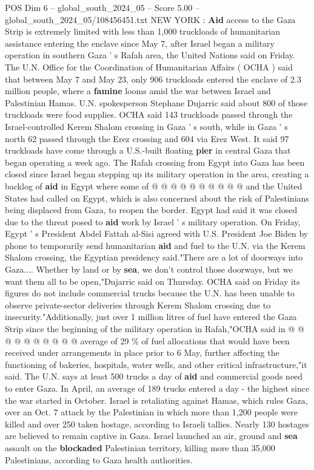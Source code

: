 \begin{textsample}{POS Dim 6 – global\_south\_2024\_05 – Score 5.00 – global\_south\_2024\_05/108456451.txt}  \label{ex:f6_pos_160}
NEW YORK : \textbf{Aid} access to the Gaza Strip is extremely limited with less than 1,000 truckloads of humanitarian assistance entering the enclave since May 7, after Israel began a military operation in southern Gaza ' s Rafah area, the United Nations said on Friday.
The U.N.
Office for the Coordination of Humanitarian Affairs ( OCHA ) said that between May 7 and May 23, only 906 truckloads entered the enclave of 2.3 million people, where a \textbf{famine} looms amid the war between Israel and Palestinian Hamas.
U.N. spokesperson Stephane Dujarric said about 800 of those truckloads were food supplies.
OCHA said 143 truckloads passed through the Israel-controlled Kerem Shalom crossing in Gaza ' s south, while in Gaza ' s north 62 passed through the Erez crossing and 604 via Erez West.
It said 97 truckloads have come through a U.S.-built floating \textbf{pier} in central Gaza that began operating a week ago.
The Rafah crossing from Egypt into Gaza has been closed since Israel began stepping up its military operation in the area, creating a backlog of \textbf{aid} in Egypt where some of @ @ @ @ @ @ @ @ @ @ and the United States had called on Egypt, which is also concerned about the risk of Palestinians being displaced from Gaza, to reopen the border.
Egypt had said it was closed due to the threat posed to \textbf{aid} work by Israel ' s military operation.
On Friday, Egypt ' s President Abdel Fattah al-Sisi agreed with U.S.
President Joe Biden by phone to temporarily send humanitarian \textbf{aid} and fuel to the U.N. via the Kerem Shalom crossing, the Egyptian presidency said."There are a lot of doorways into Gaza....
Whether by land or by \textbf{sea}, we don't control those doorways, but we want them all to be open,"Dujarric said on Thursday.
OCHA said on Friday its figures do not include commercial trucks because the U.N. has been unable to observe private-sector deliveries through Kerem Shalom crossing due to insecurity."Additionally, just over 1 million litres of fuel have entered the Gaza Strip since the beginning of the military operation in Rafah,"OCHA said in @ @ @ @ @ @ @ @ @ @ average of 29 \% of fuel allocations that would have been received under arrangements in place prior to 6 May, further affecting the functioning of bakeries, hospitals, water wells, and other critical infrastructure,"it said.
The U.N. says at least 500 trucks a day of \textbf{aid} and commercial goods need to enter Gaza.
In April, an average of 189 trucks entered a day - the highest since the war started in October.
Israel is retaliating against Hamas, which rules Gaza, over an Oct. 7 attack by the Palestinian in which more than 1,200 people were killed and over 250 taken hostage, according to Israeli tallies.
Nearly 130 hostages are believed to remain captive in Gaza.
Israel launched an air, ground and \textbf{sea} assault on the \textbf{blockaded} Palestinian territory, killing more than 35,000 Palestinians, according to Gaza health authorities.

\end{textsample}
